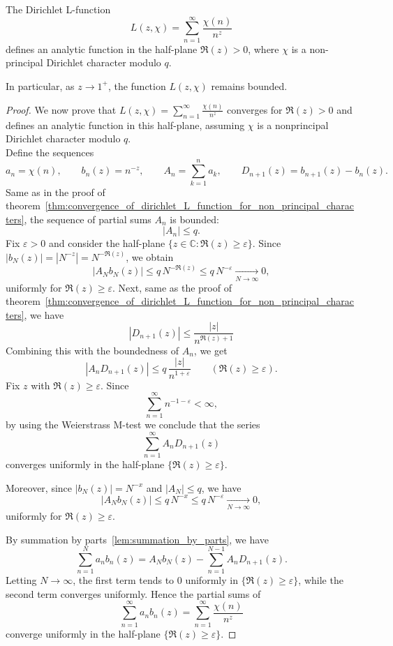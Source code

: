 \documentclass{elegantbook}
\begin{document}
\begin{theorem} \label{thm:enhanced_convergence_of_dirichlet_L_function_for_non_principal_characters}
  The Dirichlet L-function
  \[
    L(z,\chi) = \sum_{n=1}^{\infty} \frac{\chi(n)}{n^z}
  \]
  defines an analytic function in the half-plane \(\Re(z)>0\), where \(\chi\) is a non-principal Dirichlet character modulo \(q\).  

  In particular, as \(z\to 1^{+}\), the function \(L(z,\chi)\) remains bounded.
\end{theorem}

\begin{proof}
  We now prove that \(L(z,\chi)=\sum_{n=1}^{\infty}\frac{\chi(n)}{n^z}\) converges for \(\Re(z)>0\) and defines an analytic function in this half-plane, assuming \(\chi\) is a nonprincipal Dirichlet character modulo \(q\). \\
  Define the sequences
  \[
    a_n=\chi(n),\qquad b_n(z)=n^{-z},\qquad A_n=\sum_{k=1}^{n}a_k,\qquad D_{n+1}(z)=b_{n+1}(z)-b_n(z).
  \]
  Same as in the proof of theorem~\ref{thm:convergence_of_dirichlet_L_function_for_non_principal_characters}, the sequence of partial sums \(A_n\) is bounded:
  \[
    |A_n|\le q.
  \]
  Fix \(\varepsilon>0\) and consider the half-plane \(\{z\in\mathbb C:\Re(z)\ge \varepsilon\}\).
  Since \(|b_N(z)|=|N^{-z}|=N^{-\Re(z)}\), we obtain
  \[
    |A_N b_N(z)|\le q\,N^{-\Re(z)}\le q\,N^{-\varepsilon}\xrightarrow[N\to\infty]{}0,
  \]
  uniformly for \(\Re(z)\ge \varepsilon\). 
  Next, same as the proof of theorem~\ref{thm:convergence_of_dirichlet_L_function_for_non_principal_characters}, we have
  \[
    |D_{n+1}(z)| \le \frac{|z|}{n^{\Re(z)+1}}
  \]
  Combining this with the boundedness of \(A_n\), we get
  \[
    |A_n D_{n+1}(z)|\le q\,\frac{|z|}{n^{1+\varepsilon}}
    \qquad (\Re(z)\ge \varepsilon).
  \]
  Fix \(z\) with \(\Re(z)\ge \varepsilon\). Since
  \[
    \sum_{n=1}^{\infty} n^{-1-\varepsilon}<\infty,
  \]
  by using the Weierstrass M-test we conclude that the series
  \[
    \sum_{n=1}^{\infty} A_n D_{n+1}(z)
  \]
  converges uniformly in the half-plane \(\{\Re(z)\ge \varepsilon\}\).

  Moreover, since \(|b_N(z)|=N^{-x}\) and \(|A_N|\le q\), we have
  \[
    |A_N b_N(z)| \le q\,N^{-x} \le q\,N^{-\varepsilon}\xrightarrow[N\to\infty]{}0,
  \]
  uniformly for \(\Re(z)\ge \varepsilon\).

  By summation by parts~\ref{lem:summation_by_parts}, we have
  \[
    \sum_{n=1}^{N} a_n b_n(z)
    = A_N b_N(z) - \sum_{n=1}^{N-1} A_n D_{n+1}(z).
  \]
  Letting \(N\to\infty\), the first term tends to \(0\) uniformly in \(\{\Re(z)\ge \varepsilon\}\), while the second term converges uniformly. Hence the partial sums of
  \[
    \sum_{n=1}^{\infty} a_n b_n(z)
    = \sum_{n=1}^{\infty} \frac{\chi(n)}{n^z}
  \]
  converge uniformly in the half-plane \(\{\Re(z)\ge \varepsilon\}\).


\end{proof}
\end{document}
